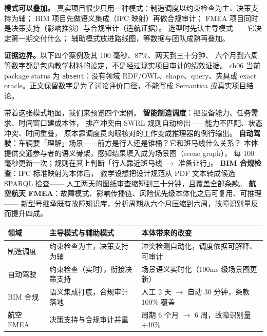 \begin{noteblock}
\textbf{模式可以叠加。}
真实项目很少只用一种模式：制造调度以约束检查为主、决策支持为辅；
BIM 项目先做语义集成（IFC 映射）再做合规审计；
FMEA 项目同时是决策支持（影响推演）与合规审计（适航证据）。
选型时先认主导模式——它决定第一期交付什么；
辅助模式放进路线图，等数据与团队成熟再叠加。
\end{noteblock}

\begin{noteblock}
\textbf{证据边界。}以下四个案例及其 100 毫秒、87\%、两天到三十分钟、
六个月到六周等数字都是包内教学材料的设定，不是经过现实项目审计的绩效证据。
ch06 当前 package status 为 \texttt{absent}：没有领域 RDF/OWL、shape、query、夹具或
exact oracle。正文保留数字是为了讨论评价口径，不能写成 Semantica 或真实项目结论。
\end{noteblock}

带着这张模式地图，我们来预览四个案例。
\textbf{智能制造调度}：把设备能力、任务需求、时间窗口建成本体，
排产冲突由 SWRL 规则自动检出——能力不匹配、状态冲突、时间重叠，
原本靠调度员肉眼核对的工作变成推理器的例行输出。
\textbf{自动驾驶}：车辆要「理解」场景——前方是行人还是锥桶？它和斑马线什么关系？
本体提供交通参与者的语义骨架，感知结果填入成为场景图（scene graph），
每 100 毫秒更新一次；规则在其上判断「行人靠近斑马线 \(\rightarrow\) 准备让行」。
\textbf{BIM 合规检查}：IFC 标准映射为本体后，
教学设想把设计规范从 PDF 文本转成候选 SPARQL 检查——
人工两天的图纸审查缩短到三十分钟，且覆盖全部条款。
\textbf{航空航天 FMEA}：故障模式、影响传播链、风险优先级本体化之后可复用、可推理——
新型号继承既有故障知识库，分析周期从六个月压缩到六周，故障识别量反而提升四成。

\begin{center}
\begin{tabularx}{\linewidth}{@{}lXX@{}}
\toprule
\textbf{领域} & \textbf{主导模式与辅助模式} & \textbf{本体带来的改变} \\
\midrule
制造调度 & 约束检查为主，决策支持为辅 & 冲突检测自动化，调度依据可解释、可审计 \\
自动驾驶 & 约束检查（实时），衔接决策支持 & 场景语义实时化（100ms 级场景图更新） \\
BIM 合规 & 语义集成打底，合规审计落地 & 人工 2 天 \(\rightarrow\) 自动 30 分钟，条款 100\% 覆盖 \\
航空 FMEA & 决策支持与合规审计并重 & 周期 6 个月 \(\rightarrow\) 6 周，故障识别量 +40\% \\
\bottomrule
\end{tabularx}
\end{center}

